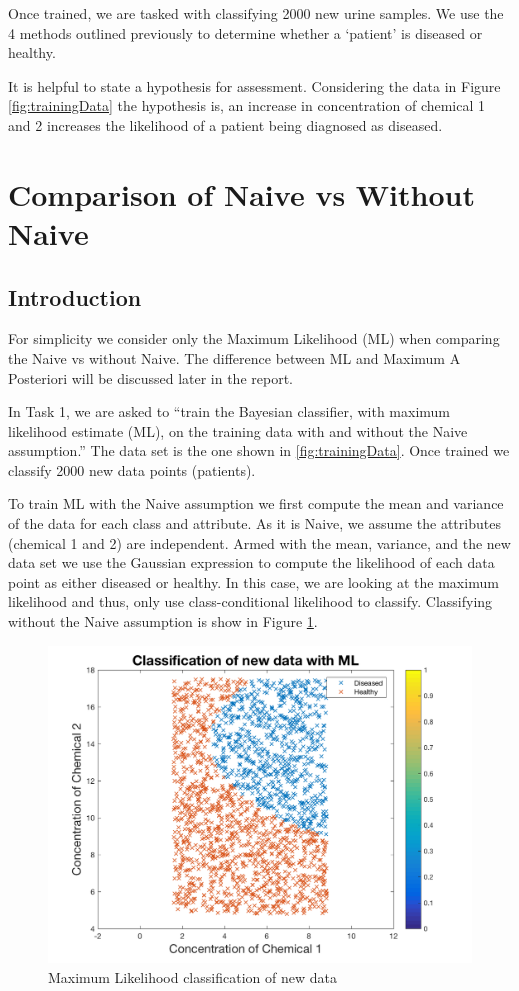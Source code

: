 Once trained, we are tasked with classifying 2000 new urine samples. We use the 4 methods outlined previously to determine whether a `patient' is diseased or healthy. 

It is helpful to state a hypothesis for assessment. Considering the data in Figure \ref{fig:trainingData} the hypothesis is, an increase in concentration of chemical 1 and 2 increases the likelihood of a patient being diagnosed as diseased.



\section{Comparison of Naive vs Without Naive}{\label{s1}
	
\subsection{Introduction}\label{Int}
For simplicity we consider only the Maximum Likelihood (ML) when comparing the Naive vs without Naive. The difference between ML and Maximum A Posteriori will be discussed later in the report.

In Task 1, we are asked to ``train the Bayesian classifier, with maximum likelihood estimate (ML), on the training data with and without the Naive assumption.'' The data set is the one shown in \ref{fig:trainingData}. Once trained we classify 2000 new data points (patients).

To train ML with the Naive assumption we first compute the mean and variance of the data for each class and attribute. As it is Naive, we assume the attributes (chemical 1 and 2) are independent. Armed with the mean, variance, and the new data set we use the Gaussian expression to compute the likelihood of each data point as either diseased or healthy. In this case, we are looking at the maximum likelihood and thus, only use class-conditional likelihood to classify. Classifying without the Naive assumption is show in Figure \ref{fig:ML}.

\begin{figure}[h]
	\centering
	\includegraphics[width=0.8\linewidth]{images/MLnewData}
	\caption{Maximum Likelihood classification of new data}
	\label{fig:ML}
\end{figure}

}
